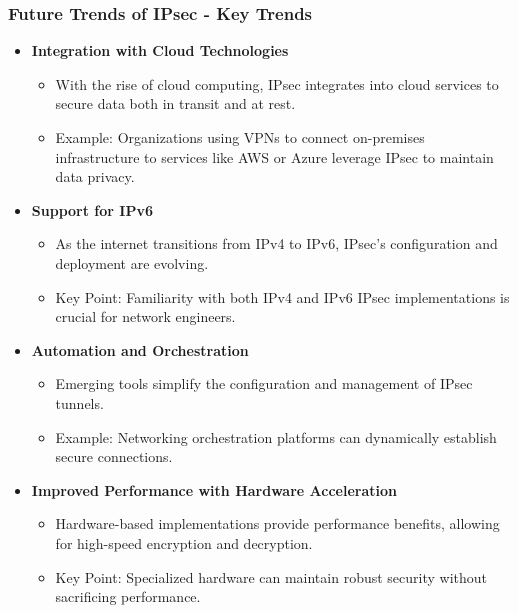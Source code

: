 \documentclass{beamer}
\begin{document}
\begin{frame}[fragile]
    \frametitle{Future Trends of IPsec - Key Trends}
    \begin{itemize}
        \item \textbf{Integration with Cloud Technologies}
        \begin{itemize}
            \item With the rise of cloud computing, IPsec integrates into cloud services to secure data both in transit and at rest.
            \item Example: Organizations using VPNs to connect on-premises infrastructure to services like AWS or Azure leverage IPsec to maintain data privacy.
        \end{itemize}
        
        \item \textbf{Support for IPv6}
        \begin{itemize}
            \item As the internet transitions from IPv4 to IPv6, IPsec's configuration and deployment are evolving.
            \item Key Point: Familiarity with both IPv4 and IPv6 IPsec implementations is crucial for network engineers.
        \end{itemize}
        
        \item \textbf{Automation and Orchestration}
        \begin{itemize}
            \item Emerging tools simplify the configuration and management of IPsec tunnels.
            \item Example: Networking orchestration platforms can dynamically establish secure connections.
        \end{itemize}
        
        \item \textbf{Improved Performance with Hardware Acceleration}
        \begin{itemize}
            \item Hardware-based implementations provide performance benefits, allowing for high-speed encryption and decryption.
            \item Key Point: Specialized hardware can maintain robust security without sacrificing performance.
        \end{itemize}
    \end{itemize}
\end{frame}
\end{document}
